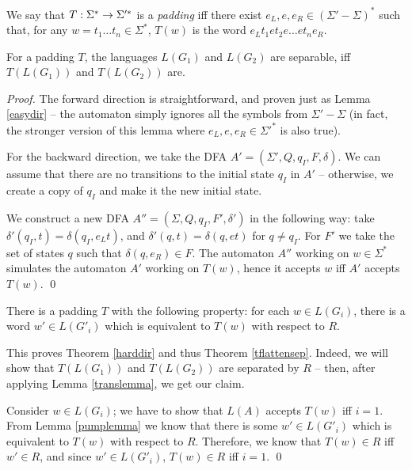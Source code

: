 \documentclass{article}
\begin{document}
We say that $T: \Sigma^* \rightarrow \Sigma'^*$ is a \emph{padding} iff
there exist $e_L, e, e_R \in (\Sigma'-\Sigma)^*$ such that,
for any $w=t_1 \ldots t_n \in \Sigma^*$,
$T(w)$ is the word $e_L t_1 e t_2 e \ldots e t_n e_R$.

\begin{lemma}\label{translemma}
For a padding $T$, 
the languages $L(G_1)$ and $L(G_2)$ are separable, iff $T(L(G_1))$ and $T(L(G_2))$ are.
\end{lemma}

\begin{proof}
The forward direction is straightforward, and proven just as Lemma \ref{easydir}
-- the automaton simply ignores all the symbols from $\Sigma'-\Sigma$ (in fact,
the stronger version of this lemma where $e_L, e, e_R \in \Sigma'^*$ is also true).

For the backward direction, we take the DFA $A' = (\Sigma', Q, q_I, F, \delta)$.
We can assume that there are no transitions to the initial state $q_I$ in $A'$ --
otherwise, we create a copy of $q_I$ and make it the new initial state.

We construct a new DFA $A'' = (\Sigma, Q, q_I, F', \delta')$ in the following way: take
$\delta'(q_I,t) = \delta(q_I, e_L t)$, and $\delta'(q,t) = \delta(q, et)$ for $q \neq q_I$.
For $F'$ we take the set of states $q$ such that $\delta(q,e_R) \in F$. 
The
automaton $A''$ working on $w \in \Sigma^*$ simulates the automaton $A'$ working
on $T(w)$, hence it accepts $w$ iff $A'$ accepts $T(w)$. \qed
\end{proof}

\begin{lemma}\label{pumplemma}
There is a padding $T$ with the following property:
for each $w \in L(G_i)$, there is a word $w' \in L(G'_i)$
which is equivalent to $T(w)$ with respect to $R$.
\end{lemma}

This proves Theorem \ref{harddir} and thus Theorem \ref{tflattensep}. Indeed,
we will show that $T(L(G_1))$ and $T(L(G_2))$ are separated by $R$ -- then, after
applying Lemma \ref{translemma}, we get our claim.

Consider $w \in L(G_i)$; we have to show that $L(A)$ accepts $T(w)$ iff $i=1$.
From Lemma \ref{pumplemma} we know that there is some $w' \in L(G'_i)$ which
is equivalent to $T(w)$ with respect to $R$. Therefore, 
we know that $T(w) \in R$ iff
$w' \in R$, and since $w' \in L(G'_i)$, $T(w) \in R$ iff $i=1$. \qed
\end{document}

